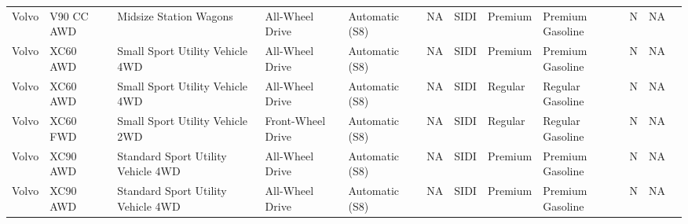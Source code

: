 \documentclass[11pt]{article}
\begin{document}
\begin{tabular}{r|lllllllllll}
	 Volvo                              & V90 CC AWD                         & Midsize Station Wagons             & All-Wheel Drive                    & Automatic (S8)                     & NA                                 & SIDI                               & Premium                            & Premium Gasoline                   & N                                  & NA                                \\
	 Volvo                              & XC60 AWD                           & Small Sport Utility Vehicle 4WD    & All-Wheel Drive                    & Automatic (S8)                     & NA                                 & SIDI                               & Premium                            & Premium Gasoline                   & N                                  & NA                                \\
	 Volvo                              & XC60 AWD                           & Small Sport Utility Vehicle 4WD    & All-Wheel Drive                    & Automatic (S8)                     & NA                                 & SIDI                               & Regular                            & Regular Gasoline                   & N                                  & NA                                \\
	 Volvo                              & XC60 FWD                           & Small Sport Utility Vehicle 2WD    & Front-Wheel Drive                  & Automatic (S8)                     & NA                                 & SIDI                               & Regular                            & Regular Gasoline                   & N                                  & NA                                \\
	 Volvo                              & XC90 AWD                           & Standard Sport Utility Vehicle 4WD & All-Wheel Drive                    & Automatic (S8)                     & NA                                 & SIDI                               & Premium                            & Premium Gasoline                   & N                                  & NA                                \\
	 Volvo                              & XC90 AWD                           & Standard Sport Utility Vehicle 4WD & All-Wheel Drive                    & Automatic (S8)                     & NA                                 & SIDI                               & Premium                            & Premium Gasoline                   & N                                  & NA                                \\

\end{tabular}
\end{document}
